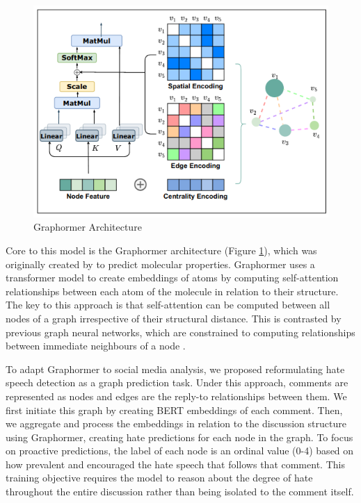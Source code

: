 \documentclass[letterpaper]{article} %
\begin{document}
\begin{figure}
\centering
\includegraphics[width=\linewidth]{graphormer.png}
\caption{Graphormer Architecture}
\label{fig:graphormer}
\end{figure}
Core to this model is the Graphormer architecture (Figure \ref{fig:graphormer}), which was originally created by \citet{ying2021transformers} to predict molecular properties. Graphormer uses a transformer model to create embeddings of atoms by computing self-attention relationships between each atom of the molecule in relation to their structure. The key to this approach is that self-attention can be computed between all nodes of a graph irrespective of their structural distance. This is contrasted by previous graph neural networks, which are constrained to computing relationships between immediate neighbours of a node \cite{wu2020comprehensive}.

To adapt Graphormer to social media analysis, we proposed reformulating hate speech detection as a graph prediction task. Under this approach, comments are represented as nodes and edges are the reply-to relationships between them. We first initiate this graph by creating BERT embeddings of each comment. Then, we aggregate and process the embeddings in relation to the discussion structure using Graphormer, creating hate predictions for each node in the graph. To focus on proactive predictions, the label of each node is an ordinal value (0-4) based on how prevalent and encouraged the hate speech that follows that comment. This training objective requires the model to reason about the degree of hate throughout the entire discussion rather than being isolated to the comment itself.
\end{document}
